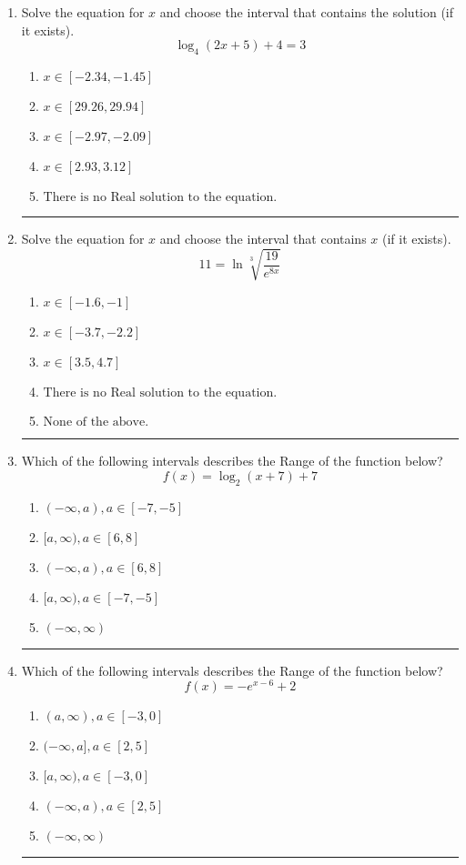 \documentclass[14pt]{extbook}
\newcommand{\litem}[1]{\item#1\hspace*{-1cm}\rule{\textwidth}{0.4pt}}
\begin{document}
\begin{enumerate}
\litem{
Solve the equation for $x$ and choose the interval that contains the solution (if it exists).\[ \log_{4}{(2x+5)}+4 = 3 \]\begin{enumerate}[label=\Alph*.]
\item \( x \in [-2.34, -1.45] \)
\item \( x \in [29.26, 29.94] \)
\item \( x \in [-2.97, -2.09] \)
\item \( x \in [2.93, 3.12] \)
\item \( \text{There is no Real solution to the equation.} \)

\end{enumerate} }
\litem{
 Solve the equation for $x$ and choose the interval that contains $x$ (if it exists).\[  11 = \ln{\sqrt[3]{\frac{19}{e^{8x}}}} \]\begin{enumerate}[label=\Alph*.]
\item \( x \in [-1.6, -1] \)
\item \( x \in [-3.7, -2.2] \)
\item \( x \in [3.5, 4.7] \)
\item \( \text{There is no Real solution to the equation.} \)
\item \( \text{None of the above.} \)

\end{enumerate} }
\litem{
Which of the following intervals describes the Range of the function below?\[ f(x) = \log_2{(x+7)}+7 \]\begin{enumerate}[label=\Alph*.]
\item \( (-\infty, a), a \in [-7, -5] \)
\item \( [a, \infty), a \in [6, 8] \)
\item \( (-\infty, a), a \in [6, 8] \)
\item \( [a, \infty), a \in [-7, -5] \)
\item \( (-\infty, \infty) \)

\end{enumerate} }
\litem{
Which of the following intervals describes the Range of the function below?\[ f(x) = -e^{x-6}+2 \]\begin{enumerate}[label=\Alph*.]
\item \( (a, \infty), a \in [-3, 0] \)
\item \( (-\infty, a], a \in [2, 5] \)
\item \( [a, \infty), a \in [-3, 0] \)
\item \( (-\infty, a), a \in [2, 5] \)
\item \( (-\infty, \infty) \)


\end{enumerate}}
\end{enumerate}
\end{document}
